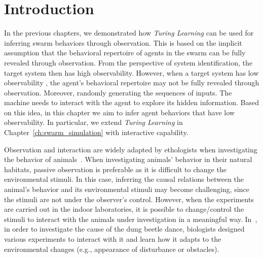 \section{Introduction}\label{sec:introduction_interaction}

In the previous chapters, we demonstrated how \textit{Turing Learning} can be used for inferring swarm behaviors through observation. This is based on the implicit assumption that the behavioral repertoire of agents in the swarm can be fully revealed through observation. From the perspective of system identification, the target system then has high observability. However, when a target system has low observability \cite{bongard2005active}, the agent's behavioral repertoire may not be fully revealed through observation. Moreover, randomly generating the sequences of inputs. The machine needs to interact with the agent to explore its hidden information. Based on this idea, in this chapter we aim to infer agent behaviors that have low observability. In particular, we extend \textit{Turing Learning} in Chapter~\ref{ch:swarm_simulation} with interactive capability. 

Observation and interaction are widely adapted by ethologists when investigating the behavior of animals~\cite{Martin_1983, Dacke2004, Emily2012}. When investigating animals' behavior in their natural habitats, passive observation is preferable as it is difficult to change the environmental stimuli. In this case, inferring the causal relations between the animal's behavior and its environmental stimuli may become challenging, since the stimuli are not under the observer's control. However, when the experiments are carried out in the indoor laboratories, it is possible to change/control the stimuli to interact with the animals under investigation in a meaningful way. In~\cite{Emily2012}, in order to investigate the cause of the dung beetle dance, biologists designed various experiments to interact with it and learn how it adapts to the environmental changes (e.g., appearance of disturbance or obstacles).

